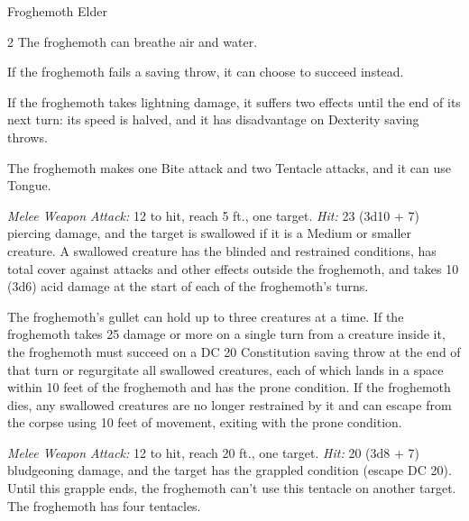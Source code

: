 \documentclass[10pt,a4paper,twoside,bg=print,twocolumn,openany,nodeprecatedcode]{dndbook}
\begin{document}
\begin{DndMonster}[float*=b,width=\textwidth + 8pt]{Froghemoth Elder}
\begin{multicols}{2}
\DndMonsterBasics[
armor-class = {14 (natural armor)},
hit-points = {\DndDice{18d12 + 90}},
speed = {30 ft., swim 30 ft.}
]
\DndMonsterAbilityScores[
 str = 25,
 dex = 13,
 con = 20,
 int = 2,
 wis = 14,
 cha = 8
]
\DndMonsterDetails[
saving-throws = {Str +12, Con +10, Wis +7},
skills = {Perception +12, Stealth +6},
damage-resistances = {fire, lightning},
senses = {darkvision 60 ft., passive perception 22},
challenge = 15,
]
The froghemoth can breathe air and water.

If the froghemoth fails a saving throw, it can choose to succeed instead.

If the froghemoth takes lightning damage, it suffers two effects until the end of its next turn: its speed is halved, and it has disadvantage on Dexterity saving throws.

The froghemoth makes one Bite attack and two Tentacle attacks, and it can use Tongue.

\textsl{Melee Weapon Attack:} 12 to hit, reach 5 ft., one target. \textsl{Hit:} 23 (3d10 + 7) piercing damage, and the target is swallowed if it is a Medium or smaller creature. A swallowed creature has the blinded and restrained conditions, has total cover against attacks and other effects outside the froghemoth, and takes 10 (3d6) acid damage at the start of each of the froghemoth's turns.

The froghemoth's gullet can hold up to three creatures at a time. If the froghemoth takes 25 damage or more on a single turn from a creature inside it, the froghemoth must succeed on a DC 20 Constitution saving throw at the end of that turn or regurgitate all swallowed creatures, each of which lands in a space within 10 feet of the froghemoth and has the prone condition. If the froghemoth dies, any swallowed creatures are no longer restrained by it and can escape from the corpse using 10 feet of movement, exiting with the prone condition.

\textsl{Melee Weapon Attack:} 12 to hit, reach 20 ft., one target. \textsl{Hit:} 20 (3d8 + 7) bludgeoning damage, and the target has the grappled condition (escape DC 20). Until this grapple ends, the froghemoth can't use this tentacle on another target. The froghemoth has four tentacles.


\end{multicols}
\end{DndMonster}
\end{document}
